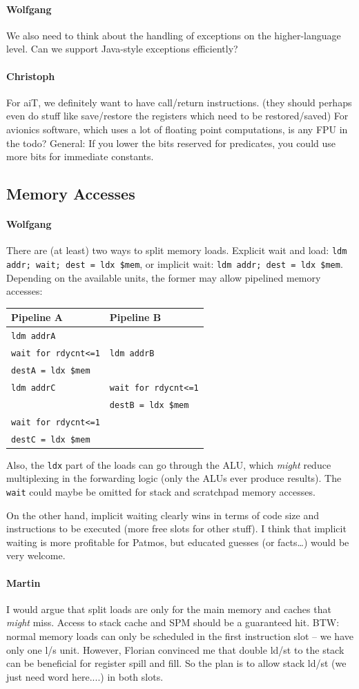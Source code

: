 \documentclass{IEEEtran}
\newcommand{\comment}[3]{\paragraph*{\textbf{#1}}{\color{#3}#2}}
\newcommand{\wolf}[1]{\comment{Wolfgang}{#1}{OliveGreen}}
\newcommand{\martin}[1]{\comment{Martin}{#1}{Blue}}
\newcommand{\cullmann}[1]{\comment{Christoph}{#1}{Maroon}}
\begin{document}
\wolf{We also need to think about the handling of exceptions on the higher-language level. Can we support Java-style exceptions efficiently?}


\cullmann{
For aiT, we definitely want to have call/return instructions. (they should perhaps even do stuff like save/restore the registers which need to be restored/saved)
For avionics software, which uses a lot of floating point computations, is any FPU in the todo?
General: If you lower the bits reserved for predicates, you could use more bits for immediate constants.
}


\subsection{Memory Accesses}

\wolf{There are (at least) two ways to split memory loads. Explicit wait and
load: \texttt{ldm addr; wait; dest = ldx \$mem}, or implicit wait:
\texttt{ldm addr; dest = ldx \$mem}. Depending on the available units,
the former may allow pipelined memory accesses:

\medskip
\begin{tabular}{ll}
  Pipeline A & Pipeline B \\
  \hline
  \texttt{ldm addrA} & \\
  \texttt{wait for rdycnt<=1} & \texttt{ldm addrB} \\
  \texttt{destA = ldx \$mem} & \\
  \texttt{ldm addrC} & \texttt{wait for rdycnt<=1} \\
                     & \texttt{destB = ldx \$mem} \\
  \texttt{wait for rdycnt<=1} & \\
  \texttt{destC = ldx \$mem} & \\
\end{tabular}

\medskip
Also, the \texttt{ldx} part of the loads can go through the ALU, which
\emph{might} reduce multiplexing in the forwarding logic (only the
ALUs ever produce results). The \texttt{wait} could maybe be omitted
for stack and scratchpad memory accesses.

On the other hand, implicit waiting clearly wins in terms of code size
and instructions to be executed (more free slots for other stuff).  I
think that implicit waiting is more profitable for Patmos, but
educated guesses (or facts\ldots) would be very welcome.}

\martin{I would argue that split loads are only for the main memory and
caches that \emph{might} miss. Access to stack cache and SPM should
be a guaranteed hit. BTW: normal memory loads can only be scheduled
in the first instruction slot -- we have only one l/s unit. However, Florian
convinced me that double ld/st to the stack can be beneficial for register
spill and fill. So the plan is to allow stack ld/st (we just need word here....)
in both slots.}
\end{document}
